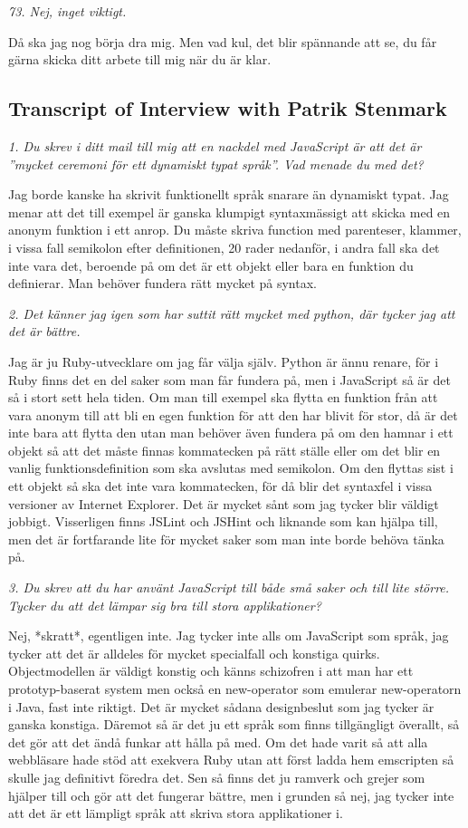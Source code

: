 \documentclass[11pt]{article}
\begin{document}
\emph{73. Nej, inget viktigt.}

Då ska jag nog börja dra mig. Men vad kul, det blir spännande att se, du får gärna skicka ditt arbete till mig när du är klar.

\subsection{Transcript of Interview with Patrik Stenmark}

\emph{1. Du skrev i ditt mail till mig att en nackdel med JavaScript är att det är ”mycket ceremoni för ett dynamiskt typat språk”. Vad menade du med det?}

Jag borde kanske ha skrivit funktionellt språk snarare än dynamiskt typat. Jag menar att det till exempel är ganska klumpigt syntaxmässigt att skicka med en anonym funktion i ett anrop. Du måste skriva function med parenteser, klammer, i vissa fall semikolon efter definitionen, 20 rader nedanför, i andra fall ska det inte vara det, beroende på om det är ett objekt eller bara en funktion du definierar. Man behöver fundera rätt mycket på syntax.

\emph{2. Det känner jag igen som har suttit rätt mycket med python, där tycker jag att det är bättre.}

Jag är ju Ruby-utvecklare om jag får välja själv. Python är ännu renare, för i Ruby finns det en del saker som man får fundera på, men i JavaScript så är det så i stort sett hela tiden. Om man till exempel ska flytta en funktion från att vara anonym till att bli en egen funktion för att den har blivit för stor, då är det inte bara att flytta den utan man behöver även fundera på om den hamnar i ett objekt så att det måste finnas kommatecken på rätt ställe eller om det blir en vanlig funktionsdefinition som ska avslutas med semikolon. Om den flyttas sist i ett objekt så ska det inte vara kommatecken, för då blir det syntaxfel i vissa versioner av Internet Explorer. Det är mycket sånt som jag tycker blir väldigt jobbigt. Visserligen finns JSLint och JSHint och liknande som kan hjälpa till, men det är fortfarande lite för mycket saker som man inte borde behöva tänka på.

\emph{3. Du skrev att du har använt JavaScript till både små saker och till lite större. Tycker du att det lämpar sig bra till stora applikationer?}

Nej, *skratt*, egentligen inte. Jag tycker inte alls om JavaScript som språk, jag tycker att det är alldeles för mycket specialfall och konstiga quirks. Objectmodellen är väldigt konstig och känns schizofren i att man har ett prototyp-baserat system men också en new-operator som emulerar new-operatorn i Java, fast inte riktigt. Det är mycket sådana designbeslut som jag tycker är ganska konstiga. Däremot så är det ju ett språk som finns tillgängligt överallt, så det gör att det ändå funkar att hålla på med. Om det hade varit så att alla webbläsare hade stöd att exekvera Ruby utan att först ladda hem emscripten så skulle jag definitivt föredra det. Sen så finns det ju ramverk och grejer som hjälper till och gör att det fungerar bättre, men i grunden så nej, jag tycker inte att det är ett lämpligt språk att skriva stora applikationer i.
\end{document}
